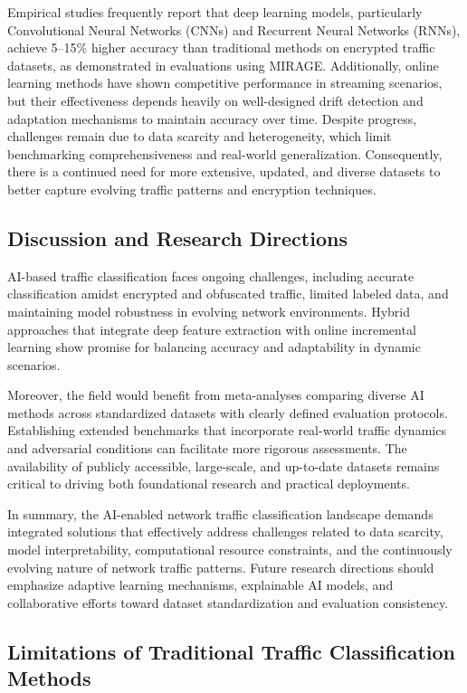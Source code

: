 \documentclass[sigconf]{acmart}
\begin{document}
Empirical studies frequently report that deep learning models, particularly Convolutional Neural Networks (CNNs) and Recurrent Neural Networks (RNNs), achieve 5–15\% higher accuracy than traditional methods on encrypted traffic datasets, as demonstrated in evaluations using MIRAGE. Additionally, online learning methods have shown competitive performance in streaming scenarios, but their effectiveness depends heavily on well-designed drift detection and adaptation mechanisms to maintain accuracy over time. Despite progress, challenges remain due to data scarcity and heterogeneity, which limit benchmarking comprehensiveness and real-world generalization. Consequently, there is a continued need for more extensive, updated, and diverse datasets to better capture evolving traffic patterns and encryption techniques.

\subsection{Discussion and Research Directions}

AI-based traffic classification faces ongoing challenges, including accurate classification amidst encrypted and obfuscated traffic, limited labeled data, and maintaining model robustness in evolving network environments. Hybrid approaches that integrate deep feature extraction with online incremental learning show promise for balancing accuracy and adaptability in dynamic scenarios.

Moreover, the field would benefit from meta-analyses comparing diverse AI methods across standardized datasets with clearly defined evaluation protocols. Establishing extended benchmarks that incorporate real-world traffic dynamics and adversarial conditions can facilitate more rigorous assessments. The availability of publicly accessible, large-scale, and up-to-date datasets remains critical to driving both foundational research and practical deployments.

In summary, the AI-enabled network traffic classification landscape demands integrated solutions that effectively address challenges related to data scarcity, model interpretability, computational resource constraints, and the continuously evolving nature of network traffic patterns. Future research directions should emphasize adaptive learning mechanisms, explainable AI models, and collaborative efforts toward dataset standardization and evaluation consistency.

\subsection{Limitations of Traditional Traffic Classification Methods}
\end{document}
